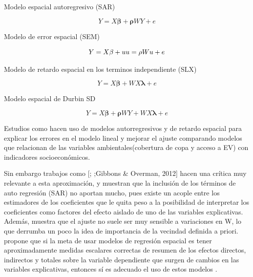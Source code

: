 \documentclass[12pt,]{book}
\begin{document}
Modelo espacial autoregresivo (SAR)

\begin{equation}
Y=X\mathbf{\beta}+\mathbf{\rho}WY+e
\label{eq:sar}
\end{equation}

Modelo de error espacial (SEM)

\begin{equation}
Y=X\mathbf{\beta}+u \\
u=\mathbf{\rho}Wu+e
\label{eq:sem}
\end{equation}

Modelo de retardo espacial en los terminos independiente (SLX)

\begin{equation}
Y=X\mathbf{\beta}+WX\mathbf{\lambda}+e
\label{eq:slx}
\end{equation}

Modelo espacial de Durbin SD

\begin{equation}
Y=X\mathbf{\beta}+\mathbf{\rho}WY+WX\mathbf{\lambda}+e
\label{eq:sd}
\end{equation}

Estudios como
\citep{landry_street_2009, schwarz_trees_2015, zhou_social_2013, shanahan_socio-economic_2014}
hacen uso de modelos autorregresivos y de retardo espacial para explicar
los errores en el modelo lineal y mejorar el ajuste comparando modelos
que relacionan de las variables ambientales(cobertura de copa y acceso a
EV) con indicadores socioeconómicos.

Sin embargo trabajos como {[}\citet{lesage_biggest_2014};
\citet{kissling_spatial_2008};Gibbons \& Overman, 2012{]} hacen una
crítica muy relevante a esta aproximación, y muestran que la inclusión
de los términos de auto regresión (SAR) no aportan mucho, pues existe un
acople entre los estimadores de los coeficientes que le quita peso a la
posibilidad de interpretar los coeficientes como factores del efecto
aislado de uno de las variables explicativas. Además, muestra que el
ajuste no suele ser muy sensible a variaciones en W, lo que derrumba un
poco la idea de importancia de la vecindad definida a priori.
\citep{lesage_biggest_2014} propone que si la meta de usar modelos de
regresión espacial es tener aproximadamente medidas escalares correctas
de resumen de los efectos directos, indirectos y totales sobre la
variable dependiente que surgen de cambios en las variables
explicativas, entonces sí es adecuado el uso de estos modelos
\citep{lesage_biggest_2014}.
\end{document}
